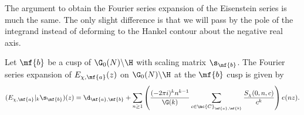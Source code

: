 \documentclass[12pt]{article}
\begin{document}
      The argument to obtain the Fourier series expansion of the Eisenstein series is much the same. The only slight difference is that we will pass by the pole of the integrand instead of deforming to the Hankel contour about the negative real axis.
      
      \begin{proposition}\label{prop:Fourier_series_Eisenstein_modular}
        Let \(\mf{b}\) be a cusp of \(\G_{0}(N)\backslash\H\) with scaling matrix \(\s_{\mf{b}}\). The Fourier series expansion of \(E_{\chi,\mf{a}}(z)\) on \(\G_{0}(N)\backslash\H\) at the \(\mf{b}\) cusp is given by
        \[
          (E_{\chi,\mf{a}}|_{k}\s_{\mf{b}})(z) = \d_{\mf{a},\mf{b}}+\sum_{n \ge 1}\left(\frac{(-2\pi i)^{k}n^{k-1}}{\G(k)}\sum_{c \in \mc{C}_{\mf{a},\mf{b}}}\frac{S_{\chi}(0,n,c)}{c^{k}}\right)e(nz).
        \]
      \end{proposition}
\end{document}
